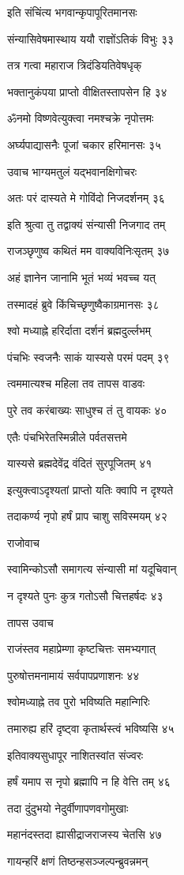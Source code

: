 इति संचिंत्य भगवान्कृपापूरितमानसः

संन्यासिवेषमास्थाय ययौ राज्ञोंऽतिकं विभुः ३३

तत्र गत्वा महाराज त्रिदंडियतिवेषधृक्

भक्तानुकंपया प्राप्तो वीक्षितस्तापसेन हि ३४

ॐनमो विष्णवेत्युक्त्वा नमश्चक्रे नृपोत्तमः

अर्घ्यपाद्यासनैः पूजां चकार हरिमानसः ३५

उवाच भाग्यमतुलं यद्भवानक्षिगोचरः

अतः परं दास्यते मे गोविंदो निजदर्शनम् ३६

इति श्रुत्वा तु तद्वाक्यं संन्यासी निजगाद तम्

राजञ्छृणुष्व कथितं मम वाक्यविनिःसृतम् ३७

अहं ज्ञानेन जानामि भूतं भव्यं भवच्च यत्

तस्मादहं ब्रुवे किंचिच्छृणुष्वैकाग्रमानसः ३८

श्वो मध्याह्ने हरिर्दाता दर्शनं ब्रह्मदुर्ल्लभम्

पंचभिः स्वजनैः साकं यास्यसे परमं पदम् ३९

त्वममात्यश्च महिला तव तापस वाडवः

पुरे तव करंबाख्यः साधुश्च तं तु वायकः ४०

एतैः पंचभिरेतस्मिन्नीले पर्वतसत्तमे

यास्यसे ब्रह्मदेवेंद्र वंदितं सुरपूजितम् ४१

इत्युक्त्वाऽदृश्यतां प्राप्तो यतिः क्वापि न दृश्यते

तदाकर्ण्य नृपो हर्षं प्राप चाशु सविस्मयम् ४२

राजोवाच

स्वामिन्कोऽसौ समागत्य संन्यासी मां यदूचिवान्

न दृश्यते पुनः कुत्र गतोऽसौ चित्तहर्षदः ४३

तापस उवाच

राजंस्तव महाप्रेम्णा कृष्टचित्तः समभ्यगात्

पुरुषोत्तमनामायं सर्वपापप्रणाशनः ४४

श्वोमध्याह्ने तव पुरो भविष्यति महान्गिरिः

तमारुह्य हरिं दृष्ट्वा कृतार्थस्त्वं भविष्यसि ४५

इतिवाक्यसुधापूर नाशितस्वांत संज्वरः

हर्षं यमाप स नृपो ब्रह्मापि न हि वेत्ति तम् ४६

तदा दुंदुभयो नेदुर्वीणापणवगोमुखाः

महानंदस्तदा ह्यासीद्राजराजस्य चेतसि ४७

गायन्हरिं क्षणं तिष्ठन्हसञ्जल्पन्ब्रुवन्नमन्

